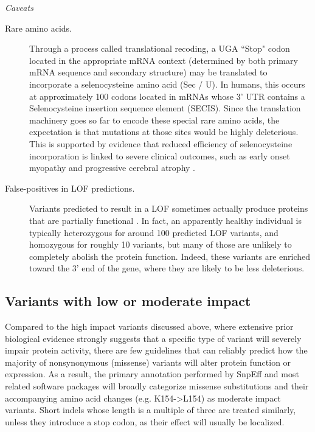 	\textit{Caveats}
	
	\begin{description}
	
	\item[Rare amino acids.] Through a process called translational recoding, a UGA ``Stop" codon located in the appropriate mRNA context (determined by both primary mRNA sequence and secondary structure) may be translated to incorporate a selenocysteine amino acid (Sec / U). In humans, this occurs at approximately 100 codons located in mRNAs whose 3’ UTR contains a Selenocysteine insertion sequence element (SECIS). Since the translation machinery goes so far to encode these special rare amino acids, the expectation is that mutations at those sites would be highly deleterious. This is supported by evidence that reduced efficiency of selenocysteine incorporation is linked to severe clinical outcomes, such as early onset myopathy  \cite{maiti2009mutation} and progressive cerebral atrophy  \cite{agamy2010mutations}.
	
	\item[False-positives in LOF predictions.] Variants predicted to result in a LOF sometimes actually produce proteins that are partially functional  \cite{macarthur2012systematic}. In fact, an apparently healthy individual is typically heterozygous for around 100 predicted LOF variants, and homozygous for roughly 10 variants, but many of those are unlikely to completely abolish the protein function. Indeed, these variants are enriched toward the 3’ end of the gene, where they are likely to be less deleterious. 
	
	\end{description}

\subsection{Variants with low or moderate impact}

Compared to the high impact variants discussed above, where extensive prior biological evidence strongly suggests that a specific type of variant will severely impair protein activity, there are few guidelines that can reliably predict how the majority of nonsynonymous (missense) variants will alter protein function or expression. As a result, the primary annotation performed by SnpEff and most related software packages will broadly categorize missense substitutions and their accompanying amino acid changes (e.g. K154->L154) as moderate impact variants. Short indels whose length is a multiple of three are treated similarly, unless they introduce a stop codon, as their effect will usually be localized.

